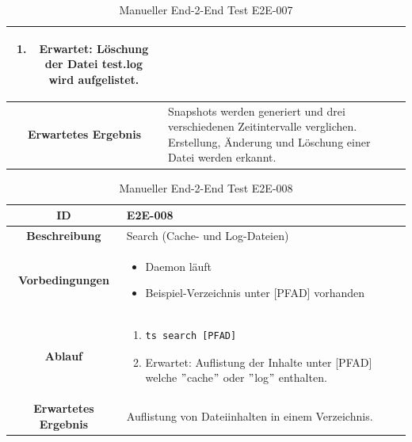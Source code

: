\documentclass[a4paper,12pt]{report}
\begin{document}
\begin{table}[h!]
\begin{tabular}{|c|p{10cm}|}
\begin{enumerate}
                \item Erwartet: Löschung der Datei test.log wird aufgelistet.
            \end{enumerate} \\ \hline
            \textbf{Erwartetes Ergebnis} & Snapshots werden generiert und drei verschiedenen Zeitintervalle verglichen.
            Erstellung, Änderung und Löschung einer Datei werden erkannt. \\ \hline
        \end{tabular}
        \caption{Manueller End-2-End Test E2E-007}\label{tab:e2e-7}
    \end{table}

    \begin{table}[h!]
        \centering
        \setlength{\leftmargini}{0.8cm}
        \begin{tabular}{|c|p{10cm}|}
            \hline
            \textbf{ID}                  & E2E-008                                            \\ \hline
            \textbf{Beschreibung}        & Search (Cache- und Log-Dateien)                    \\ \hline
            \textbf{Vorbedingungen} &
            \begin{itemize}
                \item Daemon läuft
                \item Beispiel-Verzeichnis unter [PFAD] vorhanden
            \end{itemize} \\ \hline
            \textbf{Ablauf} &
            \begin{enumerate}
                \item \begin{verbatim}ts search [PFAD]
                \end{verbatim}
                \item Erwartet: Auflistung der Inhalte unter [PFAD] welche \("\)cache\("\) oder \("\)log\("\) enthalten.
            \end{enumerate} \\ \hline
            \textbf{Erwartetes Ergebnis} & Auflistung von Dateiinhalten in einem Verzeichnis. \\ \hline
        \end{tabular}
        \caption{Manueller End-2-End Test E2E-008}\label{tab:e2e-8}
    \end{table}
\end{document}
